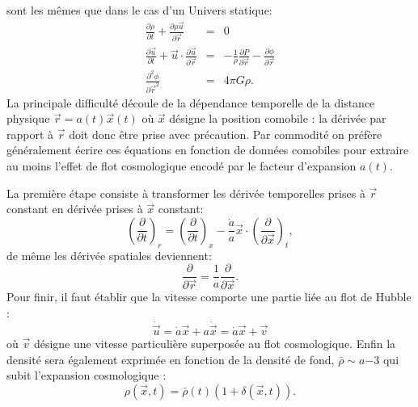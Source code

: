  sont les mêmes que dans le cas d'un Univers statique:
\begin{eqnarray}
\frac{\partial \rho}{\partial t}+\frac{\partial \rho \vec u}{\partial \vec r}&=&0\\
\frac{\partial \vec u}{\partial t}+\vec u \cdot \frac{\partial \vec u}{\partial \vec r}&=&-\frac{1}{\rho}\frac{\partial P}{\partial \vec r}-\frac{\partial \phi}{\partial \vec r}\\
\frac{\partial^2 \phi}{\partial \vec r^2}&=&4\pi G \rho.
\end{eqnarray}
 La principale difficulté découle de la dépendance temporelle de la distance physique $\vec r=a(t) \vec x(t)$ où $\vec x$ désigne la position comobile : la dérivée par rapport à $\vec r$ doit donc être prise avec précaution. Par commodité on préfère généralement écrire ces équations en fonction de données comobiles pour extraire au moins l'effet de flot cosmologique encodé par le facteur d'expansion $a(t)$.
 
La première étape consiste à transformer les dérivée temporelles prises à $\vec r$ constant en dérivée prises à $\vec x$ constant:
\begin{equation}
\left(\frac{\partial }{\partial t}\right)_r = \left(\frac{\partial }{\partial t}\right)_x-\frac{\dot a}{a}\vec x \cdot \left(\frac{\partial}{\partial \vec x}\right)_t,
\end{equation}
de même les dérivée spatiales deviennent:
\begin{equation}
\frac{\partial }{\partial \vec r}=\frac{1}{a}\frac{\partial}{\partial \vec x}.
\end{equation}
 Pour finir, il faut établir que la vitesse comporte une partie liée au flot de Hubble :
\begin{equation}
\dot {\vec u}=\dot a \vec x + a \dot {\vec x}= \dot a \vec x + \vec v
\end{equation}
 où $\vec v$ désigne une vitesse particulière superposée au flot cosmologique.
 Enfin la densité sera également exprimée en fonction de la densité de fond, $\bar \rho \sim a{-3}$ qui subit l'expansion cosmologique :
 \begin{equation}
 \rho(\vec x,t) =\bar \rho(t)(1+\delta(\vec x,t)).
 \end{equation}
 

